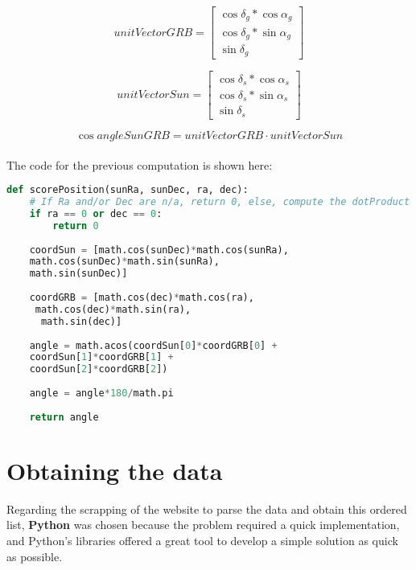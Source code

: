 \begin{equation} \label{eq:1}
	unitVectorGRB =	
	\begin{bmatrix}
	\cos\delta_{g} * \cos\alpha_{g} \\ 
	\cos\delta_{g} * \sin\alpha_{g} \\
	\sin\delta_{g}
	\end{bmatrix}
\end{equation}

\begin{equation} \label{eq:2}
	unitVectorSun =	
	\begin{bmatrix}
	\cos\delta_{s} * \cos\alpha_{s} \\ 
	\cos\delta_{s} * \sin\alpha_{s} \\
	\sin\delta_{s}
	\end{bmatrix}
\end{equation}

\begin{equation} \label{eq:3}
	\cos angleSunGRB = unitVectorGRB \cdot unitVectorSun
\end{equation}\\

The code for the previous computation is shown here:\\

\begin{lstlisting}[language=Python, caption=Python function for computing the angle]
def scorePosition(sunRa, sunDec, ra, dec):
	# If Ra and/or Dec are n/a, return 0, else, compute the dotProduct
	if ra == 0 or dec == 0:
		return 0
	
	coordSun = [math.cos(sunDec)*math.cos(sunRa),
	math.cos(sunDec)*math.sin(sunRa), 
	math.sin(sunDec)]
	
	coordGRB = [math.cos(dec)*math.cos(ra),
	 math.cos(dec)*math.sin(ra),
	  math.sin(dec)]
	
	angle = math.acos(coordSun[0]*coordGRB[0] +
	coordSun[1]*coordGRB[1] +
	coordSun[2]*coordGRB[2])
	
	angle = angle*180/math.pi
	
	return angle
\end{lstlisting} 





\section{Obtaining the data}

Regarding the scrapping of the website to parse the data and obtain this ordered list, \textbf{Python} was chosen because the problem required a quick implementation, and Python’s libraries offered a great tool to develop a simple solution as quick as possible.

